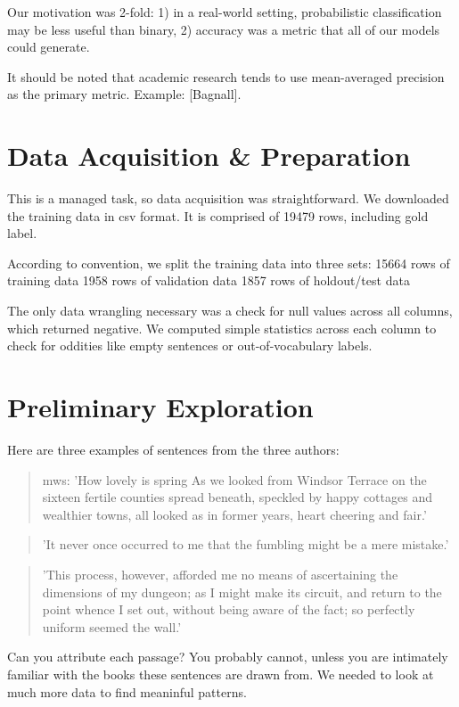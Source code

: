 \documentclass[12pt]{article}
\begin{document}
Our motivation was 2-fold: 1) in a real-world setting, probabilistic classification may be less useful than binary, 2) accuracy was a metric that all of our models could generate.

It should be noted that academic research tends to use mean-averaged precision as the primary metric. Example: [Bagnall].

\section{Data Acquisition \& Preparation}
This is a managed task, so data acquisition was straightforward. We downloaded the training data in csv format. It is comprised of 19479 rows, including gold label.

According to convention, we split the training data into three sets:
15664 rows of training data
1958 rows of validation data
1857 rows of holdout/test data

The only data wrangling necessary was a check for null values across all columns, which returned negative. We computed simple statistics across each column to check for oddities like empty sentences or out-of-vocabulary labels.


\section{Preliminary Exploration}


Here are three examples of sentences from the three authors:

\begin{quote}mws: 'How lovely is spring As we looked from Windsor Terrace on the sixteen fertile counties spread beneath, speckled by happy cottages and wealthier towns, all looked as in former years, heart cheering and fair.'
\end{quote}

\begin{quote}'It never once occurred to me that the fumbling might be a mere mistake.'
\end{quote}

\begin{quote}'This process, however, afforded me no means of ascertaining the dimensions of my dungeon; as I might make its circuit, and return to the point whence I set out, without being aware of the fact; so perfectly uniform seemed the wall.'
\end{quote}

Can you attribute each passage? You probably cannot, unless you are intimately familiar with the books these sentences are drawn from. We needed to look at much more data to find meaninful patterns.
\end{document}

